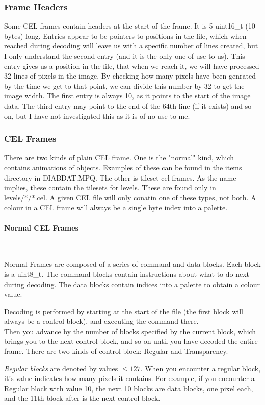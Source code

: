 \documentclass[a4paper]{article}
\newcommand{\subsubsubsection}[1] 
{
	\paragraph{#1}
	\mbox{}\\
	
	\noindent
}
\begin{document}
	\subsubsection{Frame Headers}
	\label{sec:frameheaders}
	Some CEL frames contain headers at the start of the frame. It is 5 uint16\_t (10 bytes) long. Entries appear to be pointers to positions in the file, which when reached during decoding will leave us with a specific number of lines created, but I only understand the second entry (and it is the only one of use to us). This entry gives us a position in the file, that when we reach it, we will have processed 32 lines of pixels in the image. By checking how many pixels have been genrated by the time we get to that point, we can divide this number by 32 to get the image width.
	The first entry is always 10, as it points to the start of the image data.
	The third entry may point to the end of the 64th line (if it exists) and so on, but I have not investigated this as it is of no use to me.
	
	\subsubsection{CEL Frames}
	There are two kinds of plain CEL frame. One is the "normal" kind, which contains animations of objects. Examples of these can be found in the items directory in DIABDAT.MPQ. The other is tileset cel frames. As the name implies, these contain the tilesets for levels. These are found only in levels/*/*.cel.
	A given CEL file will only conatin one of these types, not both.
A colour in a CEL frame will always be a single byte index into a palette.

	\subsubsubsection{Normal CEL Frames}
	Normal Frames are composed of a series of command and data blocks.
	Each block is a uint8\_t.
	The command blocks contain instructions about what to do next during decoding. The data blocks contain indices into a palette to obtain a colour value.
	
	Decoding is performed by starting at the start of the file (the first block will always be a control block), and executing the command there. 
	\\Then you advance by the number of blocks specified by the current block, which brings you to the next control block, and so on until you have decoded the entire frame. There are two kinds of control block: Regular and Transparency.
	
	\emph{Regular blocks} are denoted by values $\leq 127$. When you encounter a regular block, it's value indicates how many pixels it contains. For example, if you encounter a Regular block with value 10, the next 10 blocks are data blocks, one pixel each, and the 11th block after is the next control block.
	
\end{document}
